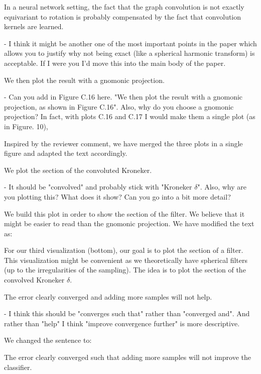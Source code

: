 \documentclass[12pt,a4paper]{article}
\newcommand{\nati}[1]{{\color[rgb]{.1,.6,.1}{NP: #1}}}
\newcommand{\todo}[1]{{\color[rgb]{.6,.1,.6}{TODO: #1}}}
\newcommand{\1}{\b{1}}              %
\newcommand{\0}{\b{0}}              %
\begin{document}
\begin{mdframed}[style=comment]
In a neural network setting, the fact that the graph convolution is not exactly equivariant to rotation is probably compensated by the fact that convolution kernels are learned.

- I think it might be another one of the most important points in the paper which allows you to justify why not being exact (like a spherical harmonic transform) is acceptable. If I were you I'd move this into the main body of the paper.
\end{mdframed}
\todo{Assign: @all, \nati{What do you think? I had the feeling we already have that in the main body of the paper. I cannot remember where, though.}}

\begin{mdframed}[style=comment]
We then plot the result with a gnomonic projection.

- Can you add in Figure C.16 here. "We then plot the result with a gnomonic projection, as shown in Figure C.16". Also, why do you choose a gnomonic projection? In fact, with plots C.16 and C.17 I would make them a single plot (as in Figure. 10),
\end{mdframed}
Inspired by the reviewer comment, we have merged the three plots in a single figure and adapted the text accordingly.

\begin{mdframed}[style=comment]
We plot the section of the convoluted Kroneker.

- It should be "convolved" and probably stick with "Kroneker $\delta$". Also, why are you plotting this? What does it show? Can you go into a bit more detail?
\end{mdframed}
We build this plot in order to show the section of the filter. We believe that it might be easier to read than the gnomonic projection. We have modified the text as:
\begin{mdframed}[style=manuscript]
For our third visualization (bottom), our goal is to plot the section of a filter. This visualization might be convenient as we theoretically have spherical filters (up to the irregularities of the sampling). The idea is to plot the section of the convolved Kroneker $\delta$.
\end{mdframed}

\begin{mdframed}[style=comment]
The error clearly converged and adding more samples will not help.

- I think this should be "converges such that" rather than "converged and". And rather than "help" I think "improve convergence further" is more descriptive.
\end{mdframed}
We changed the sentence to:
\begin{mdframed}[style=manuscript]
The error clearly converged such that adding more samples will not improve the classifier.
\end{mdframed}
\end{document}
